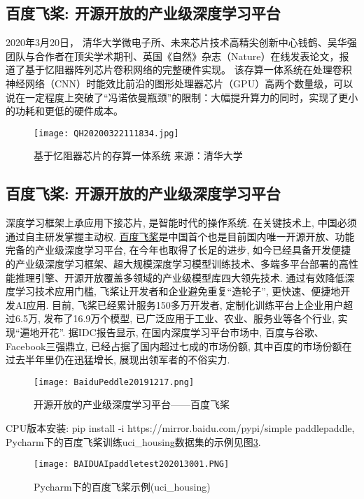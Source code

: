 \subsection{百度飞桨: 开源开放的产业级深度学习平台}
2020年3月20日， 清华大学微电子所、未来芯片技术高精尖创新中心钱鹤、吴华强团队与合作者在顶尖学术期刊、英国《自然》杂志（Nature）在线发表论文，报道了基于忆阻器阵列芯片卷积网络的完整硬件实现。
该存算一体系统在处理卷积神经网络（CNN）时能效比前沿的图形处理器芯片（GPU）高两个数量级，可以说在一定程度上突破了“冯诺依曼瓶颈”的限制：大幅提升算力的同时，实现了更小的功耗和更低的硬件成本。
\begin{figure}[H]
	\centering
	\texttt{[image: QH20200322111834.jpg]}
	\caption{基于忆阻器芯片的存算一体系统 来源：清华大学}
   \label{QH20200322111834}
\end{figure}
\subsection{百度飞桨: 开源开放的产业级深度学习平台}
深度学习框架上承应用下接芯片, 是智能时代的操作系统. 在关键技术上, 中国必须通过自主研发掌握主动权. \href{https://www.paddlepaddle.org.cn/}{百度飞桨}是中国首个也是目前国内唯一开源开放、功能完备的产业级深度学习平台, 在今年也取得了长足的进步, 如今已经具备开发便捷的产业级深度学习框架、超大规模深度学习模型训练技术、多端多平台部署的高性能推理引擎、开源开放覆盖多领域的产业级模型库四大领先技术. 通过有效降低深度学习技术应用门槛, 飞桨让开发者和企业避免重复“造轮子”, 更快速、便捷地开发AI应用. 目前, 飞桨已经累计服务150多万开发者, 定制化训练平台上企业用户超过6.5万, 发布了16.9万个模型, 已广泛应用于工业、农业、服务业等各个行业, 实现“遍地开花”. 据IDC报告显示, 在国内深度学习平台市场中, 百度与谷歌、Facebook三强鼎立, 已经占据了国内超过七成的市场份额, 其中百度的市场份额在过去半年里仍在迅猛增长, 展现出领军者的不俗实力.
\begin{figure}[H]
	\centering
	\texttt{[image: BaiduPeddle20191217.png]}
	\caption{开源开放的产业级深度学习平台——百度飞桨}
   \label{BaiduPeddle20191217}
\end{figure}

CPU版本安装: pip install -i https://mirror.baidu.com/pypi/simple paddlepaddle, Pycharm下的百度飞桨训练uci\_housing数据集的示例见图\ref{BAIDUAIpaddletest202013001}.
\begin{figure}[H]
	\centering
	\texttt{[image: BAIDUAIpaddletest202013001.PNG]}
	\caption{Pycharm下的百度飞桨示例(uci\_housing)}
   \label{BAIDUAIpaddletest202013001}
\end{figure}
